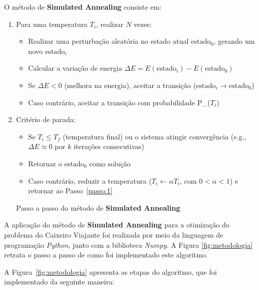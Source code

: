 \documentclass[12pt]{article}
\begin{document}
O método de \textbf{Simulated Annealing} consiste em:
\begin{enumerate}
  
  \item Para uma temperatura $T_i$, realizar $N$ vezes: \label{passo:1}
  \begin{itemize}
    \item Realizar uma perturbação aleatória no estado atual $\text{estado}_0$, gerando um novo $\text{estado}_i$
    \item Calcular a variação de energia $\Delta E = E(\text{estado}_i) - E(\text{estado}_0)$
    \item Se $\Delta E < 0$ (melhora na energia), aceitar a transição ($\text{estado}_i \rightarrow \text{estado}_0$)
    \item Caso contrário, aceitar a transição com probabilidade P_{}($T_i$)
  \end{itemize}
  
  \item Critério de parada:
  \begin{itemize} \label{passo:2}
    \item Se $T_i \leq T_f$ (temperatura final) ou o sistema atingir convergência (e.g., $\Delta E \approx 0$ por $k$ iterações consecutivas)
    \item Retornar o $\text{estado}_0$ como solução
    \item Caso contrário, reduzir a temperatura ($T_i \leftarrow \alpha T_i$, com $0 < \alpha < 1$) e retornar ao Passo~\ref{passo:1}
  \end{itemize}
  \label{pseudocodigo}
  \caption{Passo a passo do método de \textbf{Simulated Annealing}}
\end{enumerate} 

A aplicação do método de \textbf{Simulated Annealing} para a otimização do problema do Caixeiro Viajante foi realizada por meio da linguagem de programação \textit{Python}, junto com a biblioteca \textit{Numpy}.
%
A Figura \ref{fig:metodologia} retrata o passo a passo de como foi implementado este algoritmo.

A Figura~\ref{fig:metodologia} apresenta as etapas do algoritmo, que foi implementado da seguinte maneira:
\end{document}

